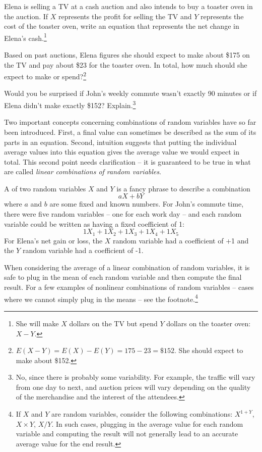 \begin{exercise} \label{elenaIsSellingATVAndBuyingAToasterOvenAtAnAuction}
Elena is selling a TV at a cash auction and also intends to buy a toaster oven in the auction. If $X$ represents the profit for selling the TV and $Y$ represents the cost of the toaster oven, write an equation that represents the net change in Elena's cash.\footnote{She will make $X$ dollars on the TV but spend $Y$ dollars on the toaster oven: $X-Y$.}
\end{exercise}

\begin{exercise}
Based on past auctions, Elena figures she should expect to make about \$175 on the TV and pay about \$23 for the toaster oven. In total, how much should she expect to make or spend?\footnote{$E(X-Y) = E(X) - E(Y) = 175 - 23 = \$152$. She should expect to make about \$152.}
\end{exercise}

\begin{exercise} \label{explainWhyThereIsUncertaintyInTheSum}
Would you be surprised if John's weekly commute wasn't exactly 90 minutes or if Elena didn't make exactly \$152? Explain.\footnote{No, since there is probably some variability. For example, the traffic will vary from one day to next, and auction prices will vary depending on the quality of the merchandise and the interest of the attendees.}
\end{exercise}

Two important concepts concerning combinations of random variables have so far been introduced. First, a final value can sometimes be described as the sum of its parts in an equation. Second, intuition suggests that putting the individual average values into this equation gives the average value we would expect in total. This second point needs clarification -- it is guaranteed to be true in what are called \emph{linear combinations of random variables}.

A  of two random variables $X$ and $Y$ is a fancy phrase to describe a combination
$$ aX + bY$$
where $a$ and $b$ are some fixed and known numbers. For John's commute time, there were five random variables -- one for each work day -- and each random variable could be written as having a fixed coefficient of 1:
$$ 1X_1 + 1 X_2 + 1 X_3 + 1 X_4 + 1 X_5 $$
For Elena's net gain or loss, the $X$ random variable had a coefficient of +1 and the $Y$ random variable had a coefficient of -1.

When considering the average of a linear combination of random variables, it is safe to plug in the mean of each random variable and then compute the final result. For a few examples of nonlinear combinations of random variables -- cases where we cannot simply plug in the means -- see the footnote.\footnote{If $X$ and $Y$ are random variables, consider the following combinations: $X^{1+Y}$, $X\times Y$, $X/Y$. In such cases, plugging in the average value for each random variable and computing the result will not generally lead to an accurate average value for the end result.}

